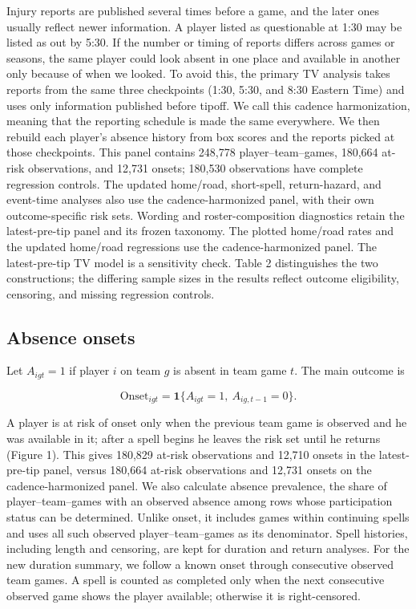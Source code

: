 \documentclass[11pt]{article}
\begin{document}
Injury reports are published several times before a game, and the later ones usually reflect newer information. A player listed as questionable at 1:30 may be listed as out by 5:30. If the number or timing of reports differs across games or seasons, the same player could look absent in one place and available in another only because of when we looked. To avoid this, the primary TV analysis takes reports from the same three checkpoints (1:30, 5:30, and 8:30 Eastern Time) and uses only information published before tipoff. We call this cadence harmonization, meaning that the reporting schedule is made the same everywhere. We then rebuild each player's absence history from box scores and the reports picked at those checkpoints. This panel contains 248,778 player--team--games, 180,664 at-risk observations, and 12,731 onsets; 180,530 observations have complete regression controls. The updated home/road, short-spell, return-hazard, and event-time analyses also use the cadence-harmonized panel, with their own outcome-specific risk sets. Wording and roster-composition diagnostics retain the latest-pre-tip panel and its frozen taxonomy. The plotted home/road rates and the updated home/road regressions use the cadence-harmonized panel. The latest-pre-tip TV model is a sensitivity check. Table 2 distinguishes the two constructions; the differing sample sizes in the results reflect outcome eligibility, censoring, and missing regression controls.



\FloatBarrier
\subsection{Absence onsets}

Let $A_{igt}=1$ if player $i$ on team $g$ is absent in team game $t$. The main outcome is

\[\mathrm{Onset}_{igt}=\mathbf{1}\{A_{igt}=1,\ A_{ig,t-1}=0\}.\]

A player is at risk of onset only when the previous team game is observed and he was available in it; after a spell begins he leaves the risk set until he returns (Figure 1). This gives 180,829 at-risk observations and 12,710 onsets in the latest-pre-tip panel, versus 180,664 at-risk observations and 12,731 onsets on the cadence-harmonized panel. We also calculate absence prevalence, the share of player--team--games with an observed absence among rows whose participation status can be determined. Unlike onset, it includes games within continuing spells and uses all such observed player--team--games as its denominator. Spell histories, including length and censoring, are kept for duration and return analyses. For the new duration summary, we follow a known onset through consecutive observed team games. A spell is counted as completed only when the next consecutive observed game shows the player available; otherwise it is right-censored.
\end{document}
